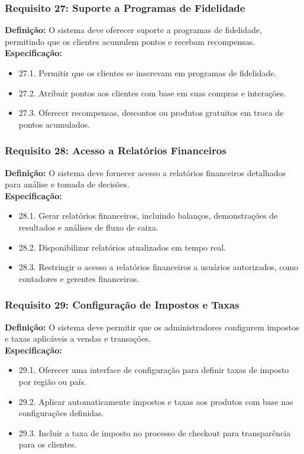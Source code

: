\subsubsection{Requisito 27: Suporte a Programas de Fidelidade}
\textbf{Definição:} O sistema deve oferecer suporte a programas de fidelidade, permitindo que os clientes acumulem pontos e recebam recompensas.
\\
\textbf{Especificação:}
\begin{itemize}
	\item 27.1. Permitir que os clientes se inscrevam em programas de fidelidade.
	\item 27.2. Atribuir pontos aos clientes com base em suas compras e interações.
	\item 27.3. Oferecer recompensas, descontos ou produtos gratuitos em troca de pontos acumulados.
\end{itemize}

\subsubsection{Requisito 28: Acesso a Relatórios Financeiros}
\textbf{Definição:} O sistema deve fornecer acesso a relatórios financeiros detalhados para análise e tomada de decisões.
\\
\textbf{Especificação:}
\begin{itemize}
	\item 28.1. Gerar relatórios financeiros, incluindo balanços, demonstrações de resultados e análises de fluxo de caixa.
	\item 28.2. Disponibilizar relatórios atualizados em tempo real.
	\item 28.3. Restringir o acesso a relatórios financeiros a usuários autorizados, como contadores e gerentes financeiros.
\end{itemize}

\subsubsection{Requisito 29: Configuração de Impostos e Taxas}
\textbf{Definição:} O sistema deve permitir que os administradores configurem impostos e taxas aplicáveis a vendas e transações.
\\
\textbf{Especificação:}
\begin{itemize}
	\item 29.1. Oferecer uma interface de configuração para definir taxas de imposto por região ou país.
	\item 29.2. Aplicar automaticamente impostos e taxas aos produtos com base nas configurações definidas.
	\item 29.3. Incluir a taxa de imposto no processo de checkout para transparência para os clientes.
\end{itemize}

